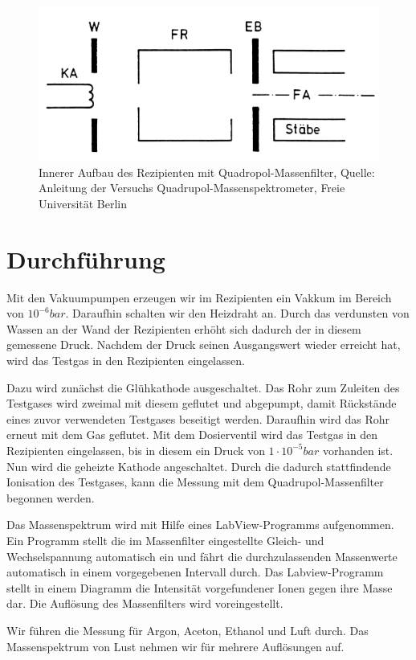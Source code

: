 \documentclass[10pt,a4paper]{article}
\begin{document}
\begin{figure}[h]
	\centering
	\includegraphics[scale = 0.7]{aufbau2.png}
	\caption{Innerer Aufbau des Rezipienten mit Quadropol-Massenfilter, Quelle: Anleitung der Versuchs Quadrupol-Massenspektrometer, Freie Universität Berlin}
	\label{aufbau2}
\end{figure}


\section{Durchführung}

Mit den Vakuumpumpen erzeugen wir im Rezipienten ein Vakkum im Bereich von $10^{-6} bar$. Daraufhin schalten wir den Heizdraht an. Durch das verdunsten von Wassen an der Wand der Rezipienten erhöht sich dadurch der in diesem gemessene Druck. Nachdem der Druck seinen Ausgangswert wieder erreicht hat, wird das Testgas in den Rezipienten eingelassen.

Dazu wird zunächst die Glühkathode ausgeschaltet. Das Rohr zum Zuleiten des Testgases wird zweimal mit diesem geflutet und abgepumpt, damit Rückstände eines zuvor verwendeten Testgases beseitigt werden. Daraufhin wird das Rohr erneut mit dem Gas geflutet. Mit dem Dosierventil wird das Testgas in den Rezipienten eingelassen, bis in diesem ein Druck von $1\cdot10^{-5} bar$ vorhanden ist. Nun wird die geheizte Kathode angeschaltet. Durch die dadurch stattfindende Ionisation des Testgases, kann die Messung mit dem Quadrupol-Massenfilter begonnen werden.

Das Massenspektrum wird mit Hilfe eines LabView-Programms aufgenommen. Ein Programm stellt die im Massenfilter eingestellte Gleich- und Wechselspannung automatisch ein und fährt die durchzulassenden Massenwerte automatisch in einem vorgegebenen Intervall durch. Das Labview-Programm stellt in einem Diagramm die Intensität vorgefundener Ionen gegen ihre Masse dar. Die Auflösung des Massenfilters wird voreingestellt.

Wir führen die Messung für Argon, Aceton, Ethanol und Luft durch. Das Massenspektrum von Lust nehmen wir für mehrere Auflösungen auf.
\end{document}
